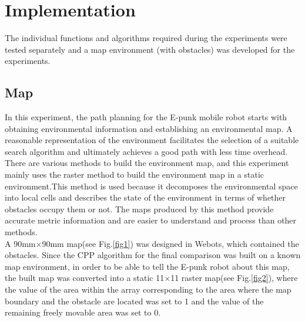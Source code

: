 \documentclass[conference]{IEEEtran}
\begin{document}
\section{Implementation}
The individual functions and algorithms required during the experiments were tested separately and a map environment (with obstacles) was developed for the experiments.
\subsection{Map}
In this experiment, the path planning for the E-punk mobile robot starts with obtaining environmental information and establishing an environmental map. A reasonable representation of the environment facilitates the selection of a suitable search algorithm and ultimately achieves a good path with less time overhead. There are various methods to build the environment map, and this experiment mainly uses the raster method\cite{moravec1985high} to build the environment map in a static environment.This method is used because it decomposes the environmental space into local cells and describes the state of the environment in terms of whether obstacles occupy them or not. The maps produced by this method provide accurate metric information and are easier to understand and process than other methods.\\
A 90mm$\times$90mm map(see Fig.\ref{fig1}) was designed in Webots, which contained the obstacles. Since the CPP algorithm for the final comparison was built on a known map environment, in order to be able to tell the E-punk robot about this map, the built map was converted into a static  11$\times$11 raster map(see Fig.\ref{fig2}), where the value of the area within the array corresponding to the area where the map boundary and the obstacle are located was set to 1 and the value of the remaining freely movable area was set to 0.
\end{document}

